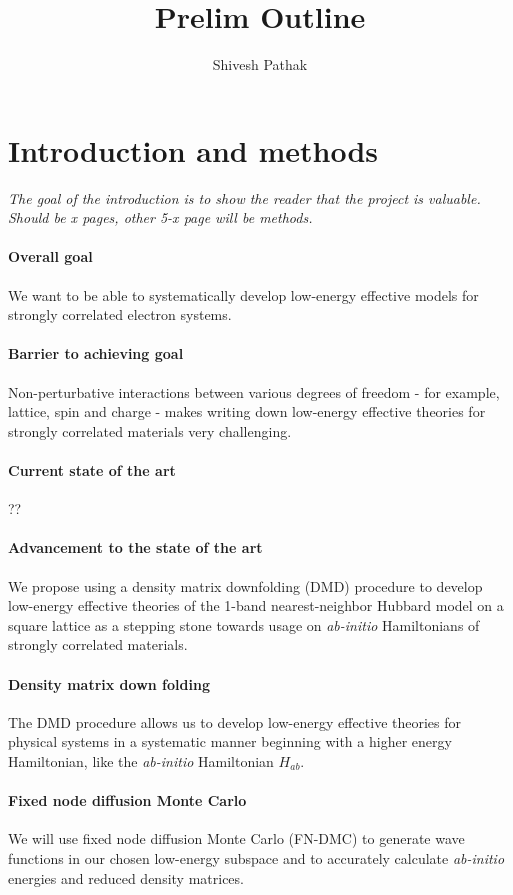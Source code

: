 \documentclass{article}
\title{Prelim Outline}
\author{Shivesh Pathak}
\begin{document}
\section{Introduction and methods}
\textit{The goal of the introduction is to show the reader that the project is valuable. Should be x pages, other 5-x page will be methods.}

\paragraph{Overall goal} We want to be able to systematically develop low-energy effective models for strongly correlated electron systems.

\paragraph{Barrier to achieving goal} Non-perturbative interactions between various degrees of freedom - for example, lattice, spin and charge - makes writing down low-energy effective theories for strongly correlated materials very challenging.

\paragraph{Current state of the art} ??

\paragraph{Advancement to the state of the art} We propose using a density matrix downfolding (DMD) procedure to develop low-energy effective theories of the 1-band nearest-neighbor Hubbard model on a square lattice as a stepping stone towards usage on \textit{ab-initio} Hamiltonians of strongly correlated materials.

\paragraph{Density matrix down folding} 
The DMD procedure allows us to develop low-energy effective theories for physical systems in a systematic manner beginning with a higher energy Hamiltonian, like the \textit{ab-initio} Hamiltonian $H_{ab}$.

\paragraph{Fixed node diffusion Monte Carlo}
We will use fixed node diffusion Monte Carlo (FN-DMC) to generate wave functions in our chosen low-energy subspace and to accurately calculate \textit{ab-initio} energies and reduced density matrices.
\end{document}
